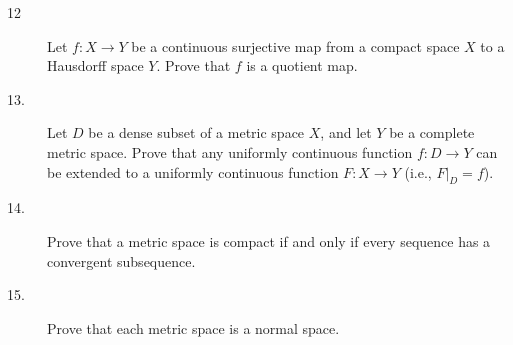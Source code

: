\documentclass[bbb]{report}
\begin{document}
\begin{large}
\begin{description}
\vspace{.5in}
\item[12]
Let $f:X\to Y$ be a continuous surjective map from a compact space
$X$ to a Hausdorff space $Y$. Prove that $f$ is a quotient map.

\vspace{.5in}
\item[13.] Let $D$ be a dense subset of a metric space $X$,
and let $Y$ be a complete metric space.
Prove that any uniformly continuous function
$f:D\to Y$ can be extended to a uniformly continuous function
$F:X\to Y$ (i.e., $F|_D=f$).

\vspace{.5in}
\item[14.]
Prove that a metric space is compact if and only if every sequence
has a convergent subsequence.

\vspace{.5in}
\item[15.]
Prove that each metric space is a normal space.

\vfill
\clearpage


\end{description}
\end{large}
\end{document}
